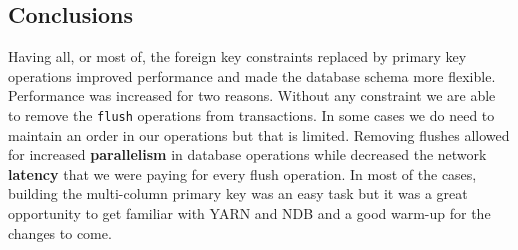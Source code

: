 \subsection{Conclusions}
\label{ssec:impl_fk_conclusions}
Having all, or most of, the foreign key constraints replaced by
primary key operations improved performance and made the database
schema more flexible. Performance was increased for two
reasons. Without any constraint we are able to remove the
\texttt{flush} operations from transactions. In some cases we do need
to maintain an order in our operations but that is limited. Removing
flushes allowed for increased \textbf{parallelism} in database operations while decreased the
network \textbf{latency} that we were paying for every flush
operation. In most of the cases, building the multi-column primary key
was an easy task but it was a great opportunity to get familiar with
YARN and NDB and a good warm-up for the changes to come.
